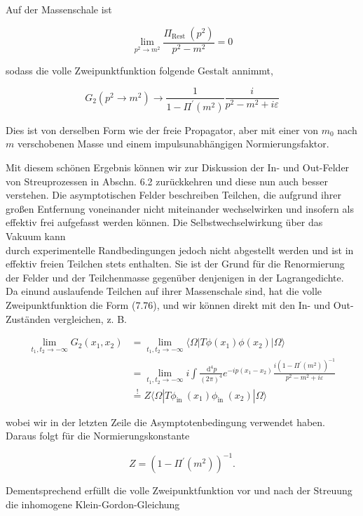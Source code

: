 \documentclass[10pt, letterpaper]{article}
\begin{document}
Auf der Massenschale ist

$$
\lim _{p^{2} \rightarrow m^{2}} \frac{\Pi_{\text {Rest }}\left(p^{2}\right)}{p^{2}-m^{2}}=0
$$

sodass die volle Zweipunktfunktion folgende Gestalt annimmt,

$$
G_{2}\left(p^{2} \rightarrow m^{2}\right) \rightarrow \frac{1}{1-\Pi^{\prime}\left(m^{2}\right)} \frac{i}{p^{2}-m^{2}+i \varepsilon}
$$

Dies ist von derselben Form wie der freie Propagator, aber mit einer von $m_{0}$ nach $m$ verschobenen Masse und einem impulsunabhängigen Normierungsfaktor.

Mit diesem schönen Ergebnis können wir zur Diskussion der In- und Out-Felder von Streuprozessen in Abschn. 6.2 zurückkehren und diese nun auch besser verstehen. Die asymptotischen Felder beschreiben Teilchen, die aufgrund ihrer großen Entfernung voneinander nicht miteinander wechselwirken und insofern als effektiv frei aufgefasst werden können. Die Selbstwechselwirkung über das Vakuum kann\\
durch experimentelle Randbedingungen jedoch nicht abgestellt werden und ist in effektiv freien Teilchen stets enthalten. Sie ist der Grund für die Renormierung der Felder und der Teilchenmasse gegenüber denjenigen in der Lagrangedichte. Da einund auslaufende Teilchen auf ihrer Massenschale sind, hat die volle Zweipunktfunktion die Form (7.76), und wir können direkt mit den In- und Out-Zuständen vergleichen, z. B.

$$
\begin{aligned}
\lim _{t_{1}, t_{2} \rightarrow-\infty} G_{2}\left(x_{1}, x_{2}\right) & =\lim _{t_{1}, t_{2} \rightarrow-\infty}\langle\Omega| T \phi\left(x_{1}\right) \phi\left(x_{2}\right)|\Omega\rangle \\
& =\lim _{t_{1}, t_{2} \rightarrow-\infty} i \int \frac{\mathrm{~d}^{4} p}{(2 \pi)^{4}} e^{-i p\left(x_{1}-x_{2}\right)} \frac{i\left(1-\Pi^{\prime}\left(m^{2}\right)\right)^{-1}}{p^{2}-m^{2}+i \varepsilon} \\
& \stackrel{!}{=} Z\langle\Omega| T \phi_{\text {in }}\left(x_{1}\right) \phi_{\text {in }}\left(x_{2}\right)|\Omega\rangle
\end{aligned}
$$

wobei wir in der letzten Zeile die Asymptotenbedingung verwendet haben. Daraus folgt für die Normierungskonstante

$$
Z=\left(1-\Pi^{\prime}\left(m^{2}\right)\right)^{-1} .
$$

Dementsprechend erfüllt die volle Zweipunktfunktion vor und nach der Streuung die inhomogene Klein-Gordon-Gleichung
\end{document}
